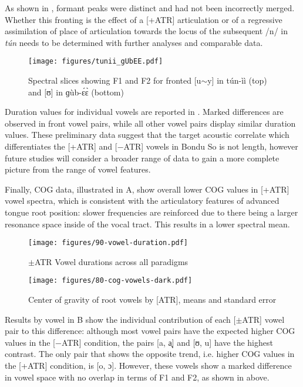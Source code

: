 \documentclass[output=paper,colorlinks,citecolor=brown]{langscibook}
\begin{document}
As shown in , formant peaks were distinct and had not been incorrectly merged. Whether this fronting is the effect of a [+ATR] articulation or of a regressive assimilation of place of articulation towards the locus of the subsequent /n/ in \textit{tún} needs to be determined with further analyses and comparable data.

\begin{figure}[h]
    \centering
    \texttt{[image: figures/tunii\_gUbEE.pdf]}
    \caption{Spectral slices showing F1 and F2 for fronted [u{$\sim$}y] in tún-ìì (top) and [ʊ] in ɡùb-ɛ́ɛ̀ (bottom)}
    \label{fig:u-fronting}
\end{figure}

Duration values for  individual vowels are reported in . Marked differences are observed in front vowel pairs, while all other vowel pairs display similar duration values. These preliminary data suggest that the target acoustic correlate which differentiates the [+ATR] and [−ATR] vowels in Bondu So is not length, however future studies will consider a broader range of data to gain a more complete picture from the range of vowel features.

Finally, COG  data, illustrated in A, show overall lower COG values in [+ATR]  vowel spectra, which is consistent with the articulatory features of advanced tongue root position: slower frequencies are reinforced due to there being a larger resonance space inside of the vocal tract. This results in a lower spectral mean.
\pagebreak

\begin{figure}[H]
    \centering
    \texttt{[image: figures/90-vowel-duration.pdf]}
    \caption{$\pm$ATR Vowel durations across all paradigms}
    \label{fig:vowel-duration}
\end{figure}\largerpage[2]

\begin{figure}[H]
    \centering
    \texttt{[image: figures/80-cog-vowels-dark.pdf]}
    \caption{Center of gravity of root vowels by [ATR], means and standard error}
    \label{fig:vowel-cog}
\end{figure}\pagebreak

Results by vowel in B show the individual contribution of each [$\pm$ATR] vowel pair to this difference: although most vowel pairs have the expected higher COG values in the [−ATR] condition, the pairs [a, a̘] and [ʊ, u] have the highest  contrast. The only pair that shows the opposite trend, i.e. higher COG values in the [+ATR] condition, is [o, ɔ]. However, these vowels show a marked difference in vowel space with no overlap in terms of F1 and F2, as shown in  above.
\end{document}
